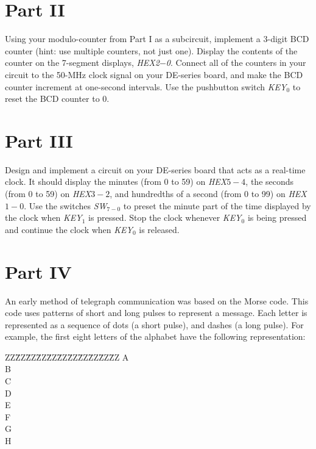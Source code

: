 \documentclass[epsfig,10pt,fullpage]{article}
\begin{document}
\section*{Part II}
Using your modulo-counter from Part I as a subcircuit, 
implement a 3-digit BCD counter (hint: use multiple counters, not just one). Display the
contents of the counter on the 7-segment displays, {\it HEX2$-$0}. Connect all of the counters
in your circuit to the 50-MHz clock signal on your DE-series board, and make the BCD counter
increment at one-second intervals.
Use the pushbutton switch {\it KEY}$_0$ to reset the BCD counter to 0.

\section*{Part III}
Design and implement a circuit on your DE-series board that acts as a real-time clock.
It should display the minutes (from 0 to 59) on {\it HEX$5-4$}, the seconds (from 0 to 59)
on {\it HEX$3-2$}, and hundredths of a second (from 0 to 99) on {\it HEX}$1-0$. Use the 
switches {\it SW}$_{7-0}$ to preset the minute 
part of the time displayed by the clock when {\it KEY}$_1$ is pressed.
Stop the clock whenever {\it KEY}$_0$ is being pressed and continue the clock when 
{\it KEY}$_0$ is released.

\section*{Part IV}
An early method of telegraph communication was based on the Morse code. This code uses 
patterns of short and long pulses to represent a message. Each letter is represented as a 
sequence of dots (a short pulse), and dashes (a long pulse). For example, the first eight 
letters of the alphabet have the following representation:

\begin{table}[H]
\begin{center}
\begin{minipage}[t]{12.5 cm}
\begin{tabbing}
ZZ\=ZZ\=ZZ\=ZZ\=ZZ\=ZZ\=ZZ\=ZZ\=ZZ\=ZZ\=ZZ\kill
\>A\>\>{\bf $\bullet$  ---}\\
\>B\>\>{\bf ---  $\bullet$  $\bullet$  $\bullet$}\\
\>C\>\>{\bf ---  $\bullet$  ---  $\bullet$}\\
\>D\>\>{\bf ---  $\bullet$  $\bullet$}\\
\>E\>\>{\bf $\bullet$}\\
\>F\>\>{\bf $\bullet$  $\bullet$  ---  $\bullet$}\\
\>G\>\>{\bf ---  ---  $\bullet$}\\
\>H\>\>{\bf $\bullet$  $\bullet$  $\bullet$  $\bullet$}\\
\end{tabbing}
\end{minipage}
\end{center}
\end{table}
\end{document}
